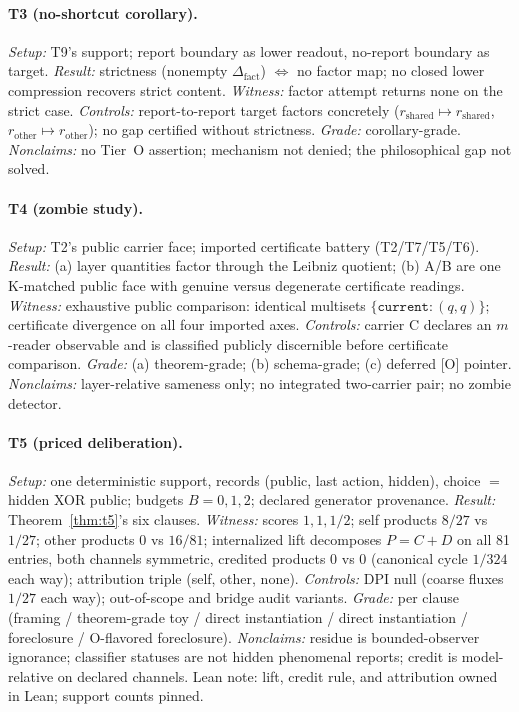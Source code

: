 \documentclass[11pt]{article}
\newcommand{\gradeO}{\textsf{[O]}}
\newcommand{\Dfact}{\Delta_{\mathrm{fact}}}
\theoremstyle{definition}
\begin{document}
\paragraph{T3 (no-shortcut corollary).}
\emph{Setup:} T9's support; report boundary as lower readout, no-report
boundary as target. \emph{Result:} strictness (nonempty $\Dfact$) $\iff$ no
factor map; no closed lower compression recovers strict content.
\emph{Witness:} factor attempt returns none on the strict case.
\emph{Controls:} report-to-report target factors concretely
($r_\mathrm{shared} \mapsto r_\mathrm{shared}$, $r_\mathrm{other} \mapsto
r_\mathrm{other}$); no gap certified without strictness. \emph{Grade:}
corollary-grade. \emph{Nonclaims:} no Tier~O assertion; mechanism not denied;
the philosophical gap not solved.

\paragraph{T4 (zombie study).}
\emph{Setup:} T2's public carrier face; imported certificate battery
(T2/T7/T5/T6). \emph{Result:} (a) layer quantities factor through the
Leibniz quotient; (b) A/B are one K-matched public face with genuine versus
degenerate certificate readings. \emph{Witness:} exhaustive public
comparison: identical multisets $\{\texttt{current}: (q,q)\}$; certificate
divergence on all four imported axes. \emph{Controls:} carrier C declares an
$m$-reader observable and is classified publicly discernible before
certificate comparison. \emph{Grade:} (a) theorem-grade; (b) schema-grade;
(c) deferred \gradeO{} pointer. \emph{Nonclaims:} layer-relative sameness
only; no integrated two-carrier pair; no zombie detector.

\paragraph{T5 (priced deliberation).}
\emph{Setup:} one deterministic support, records (public, last action,
hidden), choice $=$ hidden XOR public; budgets $B = 0,1,2$; declared
generator provenance. \emph{Result:} Theorem~\ref{thm:t5}'s six clauses.
\emph{Witness:} scores $1, 1, 1/2$; self products $8/27$ vs $1/27$; other
products $0$ vs $16/81$; internalized lift decomposes $P = C + D$ on all 81
entries, both channels symmetric, credited products $0$ vs $0$ (canonical
cycle $1/324$ each way); attribution triple (self, other, none).
\emph{Controls:} DPI null (coarse fluxes $1/27$ each way); out-of-scope and
bridge audit variants. \emph{Grade:} per clause (framing / theorem-grade toy
/ direct instantiation / direct instantiation / foreclosure / O-flavored
foreclosure). \emph{Nonclaims:} residue is bounded-observer ignorance;
classifier statuses are not hidden phenomenal reports; credit is
model-relative on declared channels. Lean note: lift, credit rule, and
attribution owned in Lean; support counts pinned.
\end{document}
